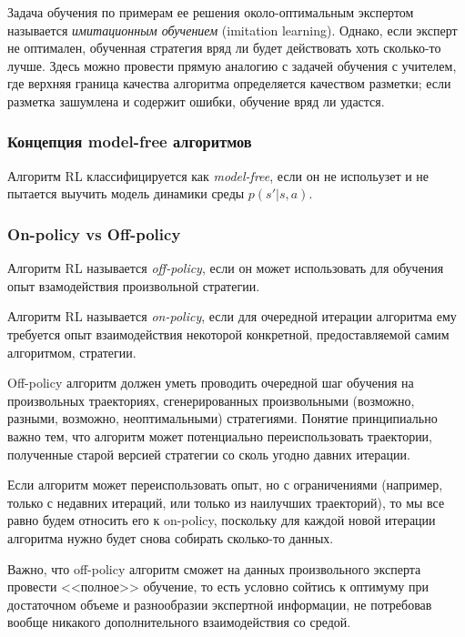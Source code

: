 \documentclass[%
	11pt,
	a4paper,
	utf8,
		]{article}
\begin{document}
Задача обучения по примерам ее решения около-оптимальным экспертом называется \emph{имитационным обучением} (imitation learning). Однако, если эксперт не оптимален, обученная стратегия вряд ли будет действовать хоть сколько-то лучше. Здесь можно провести прямую аналогию с задачей обучения с учителем, где верхняя граница качества алгоритма определяется качеством разметки; если разметка зашумлена и содержит ошибки, обучение вряд ли удастся.

\subsubsection{Концепция model-free алгоритмов}

Алгоритм RL классифицируется как \emph{model-free}, если он не испольузет и не пытается выучить модель динамики среды $ p(s' | s, a) $.

\subsubsection{On-policy vs Off-policy}

Алгоритм RL называется \emph{off-policy}, если он может использовать для обучения опыт взамодействия произвольной стратегии.

Алгоритм RL называется \emph{on-policy}, если для очередной итерации алгоритма ему требуется опыт взаимодействия некоторой конкретной, предоставляемой самим алгоритмом, стратегии.

Off-policy алгоритм должен уметь проводить очередной шаг обучения на произвольных траекториях, сгенерированных произвольными (возможно, разными, возможно, неоптимальными) стратегиями. Понятие принципиально важно тем, что алгоритм может потенциально переиспользовать траектории, полученные старой версией стратегии со сколь угодно давних итерации.

Если алгоритм может переиспользовать опыт, но с ограничениями (например, только с недавних итераций, или только из наилучших траекторий), то мы все равно будем относить его к on-policy, поскольку для каждой новой итерации алгоритма нужно будет снова собирать сколько-то данных. 

Важно, что off-policy алгоритм сможет на данных произвольного эксперта провести <<полное>> обучение, то есть условно сойтись к оптимуму при достаточном объеме и разнообразии экспертной информации, не потребовав вообще никакого дополнительного взаимодействия со средой.



\listoffigures{}
\end{document}
